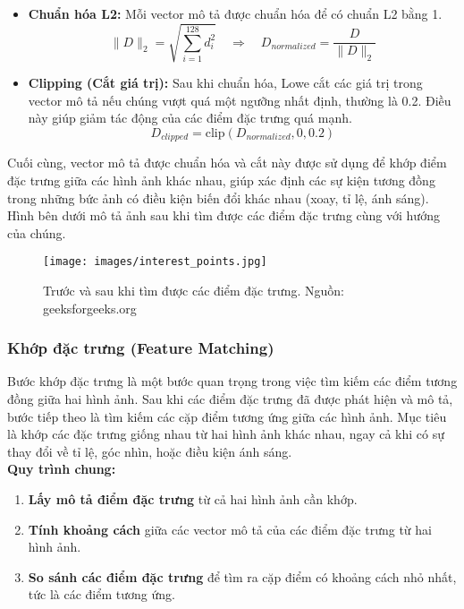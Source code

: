 \begin{itemize}
	\item \textbf{Chuẩn hóa L2:} Mỗi vector mô tả được chuẩn hóa để có chuẩn L2 bằng 1.
	\[
	\| D \|_2 = \sqrt{\sum_{i=1}^{128} d_i^2} \quad \Rightarrow \quad D_{normalized} = \frac{D}{\| D \|_2}
	\]
	
	\item \textbf{Clipping (Cắt giá trị):} Sau khi chuẩn hóa, Lowe cắt các giá trị trong vector mô tả nếu chúng vượt quá một ngưỡng nhất định, thường là 0.2. Điều này giúp giảm tác động của các điểm đặc trưng quá mạnh.
	\[
	D_{clipped} = \text{clip}(D_{normalized}, 0, 0.2)
	\]
\end{itemize}

Cuối cùng, vector mô tả được chuẩn hóa và cắt này được sử dụng để khớp điểm đặc trưng giữa các hình ảnh khác nhau, giúp xác định các sự kiện tương đồng trong những bức ảnh có điều kiện biến đổi khác nhau (xoay, tỉ lệ, ánh sáng). Hình bên dưới mô tả ảnh sau khi tìm được các điểm đặc trưng cùng với hướng của chúng.

\begin{figure}[H]
	\centering
	\texttt{[image: images/interest\_points.jpg]}
	\caption{Trước và sau khi tìm được các điểm đặc trưng. Nguồn: geeksforgeeks.org\cite{gfg}}
\end{figure}
\subsubsection{Khớp đặc trưng (Feature Matching)}
Bước khớp đặc trưng là một bước quan trọng trong việc tìm kiếm các điểm tương đồng giữa hai hình ảnh. Sau khi các điểm đặc trưng đã được phát hiện và mô tả, bước tiếp theo là tìm kiếm các cặp điểm tương ứng giữa các hình ảnh. Mục tiêu là khớp các đặc trưng giống nhau từ hai hình ảnh khác nhau, ngay cả khi có sự thay đổi về tỉ lệ, góc nhìn, hoặc điều kiện ánh sáng.\\

\textbf{Quy trình chung:}
\begin{enumerate}
	\item \textbf{Lấy mô tả điểm đặc trưng} từ cả hai hình ảnh cần khớp.
	\item \textbf{Tính khoảng cách} giữa các vector mô tả của các điểm đặc trưng từ hai hình ảnh.
	\item \textbf{So sánh các điểm đặc trưng} để tìm ra cặp điểm có khoảng cách nhỏ nhất, tức là các điểm tương ứng.
\end{enumerate}

